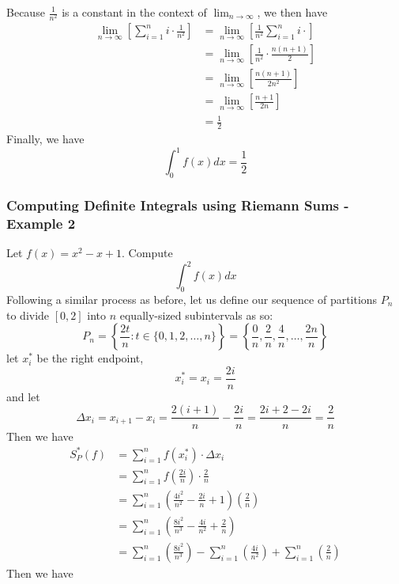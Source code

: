 \documentclass[10pt]{article}
\begin{document}
Because $\frac{1}{n^2}$ is a constant in the context of {\footnotesize$\displaystyle\lim_{n\to\infty}$}, we then have
$$
    \begin{aligned}
        \lim_{n\to\infty}\left[\sum_{i=1}^n i\cdot \frac{1}{n^2}\right] &= \lim_{n\to\infty}\left[\frac{1}{n^2}\sum_{i=1}^n i\cdot\right] \\
        &=\lim_{n\to\infty}\left[\frac{1}{n^2}\cdot\frac{n(n+1)}{2}\right] \\
        &=\lim_{n\to\infty}\left[\frac{n(n+1)}{2n^2}\right] \\
        &=\lim_{n\to\infty}\left[\frac{n+1}{2n}\right] \\
        &=\frac{1}{2}
    \end{aligned}
$$
Finally, we have
$$
    \int_0^1f(x)dx=\frac{1}{2}
$$
\subsubsection{Computing Definite Integrals using Riemann Sums - Example 2}
Let $f(x)=x^2-x+1$. Compute
$$
    \int_0^2 f(x)dx
$$
Following a similar process as before, let us define our sequence of partitions $P_n$ to divide $[0,2]$ into $n$ equally-sized subintervals as so:
$$
    P_n=\left\{\frac{2t}{n}:t\in\{0,1,2,\dots,n\}\right\}=\left\{\frac{0}{n},\frac{2}{n},\frac{4}{n},\dots,\frac{2n}{n}\right\}
$$
let $x_i^*$ be the right endpoint,
$$x_i^*=x_i=\frac{2i}{n}$$
and let
$$
    \Delta x_i=x_{i+1}-x_i=\frac{2(i+1)}{n}-\frac{2i}{n}=\frac{2i+2-2i}{n}=\frac{2}{n}
$$
Then we have
$$
   \begin{aligned}
        S_P^*(f)&=\sum_{i=1}^n f(x_i^*)\cdot\Delta x_i \\
        &=\sum_{i=1}^n f\left(\frac{2i}{n}\right)\cdot\frac{2}{n} \\
        &=\sum_{i=1}^n\left(\frac{4i^2}{n^2}-\frac{2i}{n}+1\right)\left(\frac{2}{n}\right) \\
        &=\sum_{i=1}^n\left(\frac{8i^2}{n^3}-\frac{4i}{n^2}+\frac{2}{n}\right) \\
        &=\sum_{i=1}^n\left(\frac{8i^2}{n^3}\right)-\sum_{i=1}^n\left(\frac{4i}{n^2}\right)+\sum_{i=1}^n\left(\frac{2}{n}\right)
   \end{aligned}
$$
Then we have 
\end{document}
